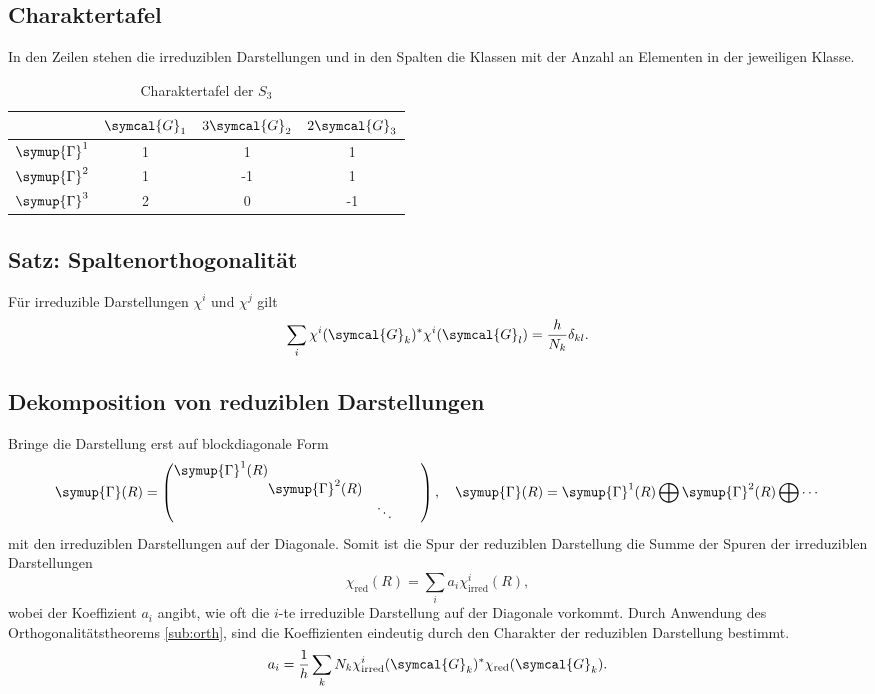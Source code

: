 \documentclass[
  captions=tableheading,  %
  titlepage=firstiscover, %
]{scrartcl}
\begin{document}
\subsection{Charaktertafel}
In den Zeilen stehen die irreduziblen Darstellungen und in den Spalten die Klassen mit 
der Anzahl an Elementen in der jeweiligen Klasse.
\begin{table}
  \centering
  \caption{Charaktertafel der $S_3$}
  \label{tab:some_data}
  \begin{tabular}{S[table-format=10.0] S[table-format = 1.0] S S}
  \toprule
   & {$\symcal{G}_1$} & {$3\symcal{G}_2$} & {$2\symcal{G}_3$} \\
  \midrule
  {$\symup{\Gamma}^1$} & 1 & 1  & 1   \\
  {$\symup{\Gamma}^2$} & 1 & -1 & 1   \\
  {$\symup{\Gamma}^3$} & 2 & 0  & -1  \\
  \bottomrule
  \end{tabular}
  \end{table}
\subsection{Satz: Spaltenorthogonalität}
Für irreduzible Darstellungen $\chi^i$ und $\chi^j$ gilt
\begin{equation*}
  \sum_i \chi^i(\symcal{G}_k)^* \chi^i(\symcal{G}_l) = \frac{h}{N_k} \delta_{kl}.
\end{equation*}
\subsection{Dekomposition von reduziblen Darstellungen}
Bringe die Darstellung erst auf blockdiagonale Form
\begin{equation*}
  \symup{\Gamma} (R) = 
  \begin{pmatrix}
    \symup{\Gamma}^1 (R)  &       &    \\
    & \!\!\!\!\!\! \symup{\Gamma}^2(R) &  \\
    & & \ddots \quad \quad
  \end{pmatrix}
  , \quad \symup{\Gamma} (R) = \symup{\Gamma}^1 (R)\bigoplus \symup{\Gamma}^2(R) \bigoplus \cdots
\end{equation*}
mit den irreduziblen Darstellungen auf der Diagonale.
Somit ist die Spur der reduziblen Darstellung die Summe der Spuren der irreduziblen Darstellungen
\begin{equation*}
  \chi_{\text{red}} (R) = \sum_i a_i \chi_{\text{irred}}^i(R),
\end{equation*}
wobei der Koeffizient $a_i$ angibt, wie oft die $i$-te irreduzible Darstellung auf der 
Diagonale vorkommt.
Durch Anwendung des Orthogonalitätstheorems \ref{sub:orth}, sind die Koeffizienten eindeutig 
durch den Charakter der reduziblen Darstellung bestimmt.
\begin{equation}
  a_i = \frac{1}{h} \sum_k N_k \chi_{\text{irred}}^i (\symcal{G}_k)^* \chi_{\text{red}} (\symcal{G}_k) . \label{eqn:decomp}
\end{equation}
\end{document}
